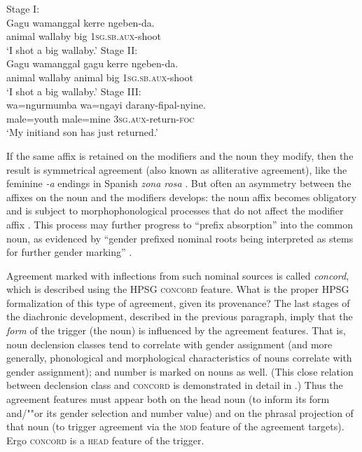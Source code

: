 \documentclass[output=paper
                ,modfonts
                ,nonflat
	        ,collection
	        ,collectionchapter
	        ,collectiontoclongg
 	        ,biblatex
                ,babelshorthands
                ,newtxmath
                ,draftmode
                ,colorlinks, citecolor=brown
]{./langsci/langscibook}
\begin{document}
{\begin{exe}
\ex
\begin{xlist}
\ex \label{wallaby1} Stage I: \\
\gll 	Gagu	   wamanggal	  kerre    ngeben-da. \\
	     animal	wallaby	      big	      1\textsc{sg.sb.aux}-shoot \\
\glt `I shot a big wallaby.’	
\ex \label{wallaby2} Stage II: \\
\gll 	Gagu	   wamanggal	   gagu	kerre	    ngeben-da. \\
	animal	wallaby	  animal     	big	1\textsc{sg.sb.aux}-shoot\\
\glt `I shot a big wallaby.’
\ex \label{wallaby3} Stage III: \\
\gll 	wa=ngurmumba	wa=ngayi	darany-fipal-nyine. \\
	male=youth		male=mine	\textsc{3sg.aux}-return-\textsc{foc} \\
\glt 	`My initiand son has just returned.’ 
\end{xlist}
\end{exe}

\noindent
If the same affix is retained on the modifiers and the noun they modify, then the result is symmetrical agreement (also known as alliterative agreement), like the feminine \textit{-a} endings in Spanish \textit{zona rosa} \citep[87--88]{corbett:2006}.  But often an asymmetry between the affixes on the  noun and the modifiers develops: the noun affix becomes obligatory and is subject to morphophonological processes that do not affect the modifier affix \citep[216]{reid:1997}.    This process may further progress to ``prefix absorption'' into the common noun, as evidenced by ``gender prefixed nominal roots being interpreted as stems for further gender marking'' \citep[217]{reid:1997}.


Agreement marked with inflections from such nominal sources is called \emph{concord}, which is described using the HPSG \textsc{concord} feature.  What is the proper HPSG formalization of this type of agreement, given its provenance?   The last stages of the diachronic development, described in the previous paragraph, imply that the \textit{form} of the trigger (the noun) is influenced by the agreement features.  That is, noun declension classes tend to correlate with gender assignment (and more generally, phonological and morphological characteristics of nouns correlate with gender assignment); and number is marked on nouns as well.  (This close relation between declension class and \textsc{concord} is demonstrated in detail in \citealt[Chapter~2]{Wechsler+Zlatic:2003}.) Thus the agreement features must appear both on the head noun (to inform its form and/""or its gender selection and number value) and on the phrasal projection of that noun (to trigger agreement via the \textsc{mod} feature of the agreement targets).  Ergo \textsc{concord} is a \textsc{head} feature of the trigger.  

}
\end{document}
